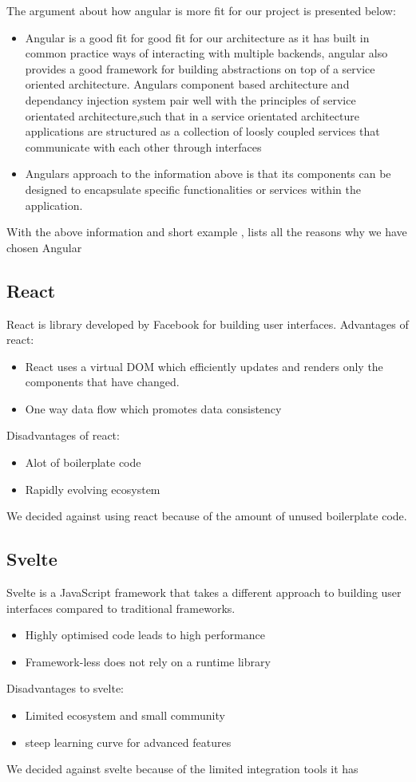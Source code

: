 \documentclass[12pt]{article}
\begin{document}
The argument about how angular is more fit for our project is presented below:
\begin{itemize}
    \item Angular is a good fit for good fit for our architecture as it has built in common practice ways of interacting with multiple backends, angular also provides a good framework for building abstractions on top of a service oriented architecture. Angulars component based architecture and dependancy injection system pair well with the principles of service orientated architecture,such that in a service orientated architecture applications are structured as a collection of loosly coupled services that communicate with each other through interfaces 
    \item Angulars approach to the information above is that its components can be designed to encapsulate specific functionalities or services within the application.
\end{itemize}
With the above information and short example , lists all the reasons why we have chosen Angular
\subsection{React}
React is library developed by Facebook for building user interfaces.
Advantages of react: 
\begin{itemize}
    \item React uses a virtual DOM which efficiently updates and renders only the components that have changed.
    \item One way data flow which promotes data consistency
\end{itemize}
Disadvantages of react:
\begin{itemize}
    \item Alot of boilerplate code
    \item Rapidly evolving ecosystem 
\end{itemize}
We decided against using react because of the amount of unused boilerplate code.

\subsection{Svelte}
Svelte is a JavaScript framework that takes a different approach to building user interfaces compared to traditional frameworks.
\begin{itemize}
    \item Highly optimised code leads to high performance 
    \item Framework-less does not rely on a runtime library
\end{itemize}
Disadvantages to svelte:
\begin{itemize}
    \item Limited ecosystem and small community
    \item steep learning curve for advanced features
\end{itemize}
We decided against svelte because of the limited integration tools it has 
\end{document}

